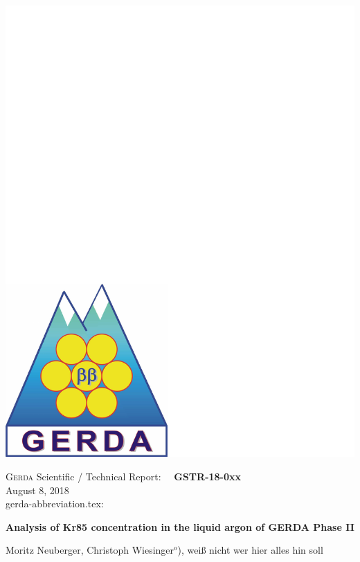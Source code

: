 \documentclass[11pt,a4paper]{article}
\newcommand{\repnumber}  {GSTR-18-0xx}    %
\newcommand{\repdate}    {August 8, 2018} %
\newcommand{\titleheader}{Analysis of Kr85 concentration in the liquid argon of GERDA Phase II} %
\begin{document}
\begin{titlepage}
\parbox[b]{40mm}{
\ifmakefigures%
  \vspace*{-7truecm}
  \includegraphics[scale=0.25]{./gerda-GSTR-logo.pdf}
\fi%
  }
\parbox[b]{110mm}{\hfill\hfill
\textsc{Gerda} Scientific / Technical Report:~~ \textbf{\repnumber}\\[12mm]
 \hspace*{30mm}\hfill\hfill\repdate\\
 \hspace*{1mm}\hfill\small gerda-abbreviation.tex:~\versionabb}

\vspace*{20mm}
\begin{center}
{\Large\textbf{\titleheader}}
\vspace*{10mm}

Moritz Neuberger, Christoph Wiesinger$^o$), weiß nicht wer hier alles hin soll
\vspace*{5mm}


\end{center}
\end{titlepage}
\end{document}
